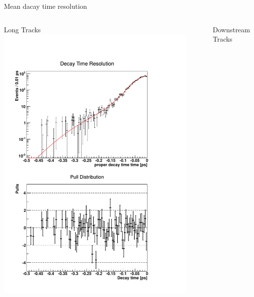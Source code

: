 \documentclass{beamer}
\begin{document}
	
	\begin{frame}{Mean dacay time resolution}
		\begin{columns}
	\begin{block}{Long Tracks}
	\centering
	\includegraphics[width=0.92\textwidth]{resolution_lt}
	\end{block}
	\begin{block}{Downstream Tracks}
	\centering

\end{block}
\end{columns}
\end{frame}
\end{document}

